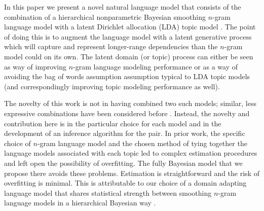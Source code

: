 



In this paper we present a novel natural language model that consists of the combination of a hierarchical nonparametric Bayesian smoothing $n$-gram language model with a latent Dirichlet allocation (LDA) topic model \cite{Blei2003a}.  The point of doing this is to augment the language model with a latent generative process which will capture and represent longer-range dependencies than the $n$-gram model could on its own.  The latent domain (or topic) process can either be seen as way of improving $n$-gram language modeling performance or as a way of avoiding the bag of words assumption assumption typical to LDA topic models (and correspondingly improving topic modeling performance as well).  

The novelty of this work is not in having combined two such models; similar, less expressive combinations have been considered before \cite{Wallach2006}.  Instead, the novelty and contribution here is in the particular choice for each model and in the development of an inference algorithm for the pair.  In prior work, the specific choice of  $n$-gram language model and the chosen method of tying together the language models associated with each topic led to complex estimation procedures and left open the possibility of overfitting.  The fully Bayesian model that we propose there avoids these problems.   Estimation is straightforward and the risk of overfitting is minimal.   This is attributable to our choice of a domain adapting language model that shares statistical strength between smoothing $n$-gram language models in a hierarchical Bayesian way \cite{Wood2009}.   

